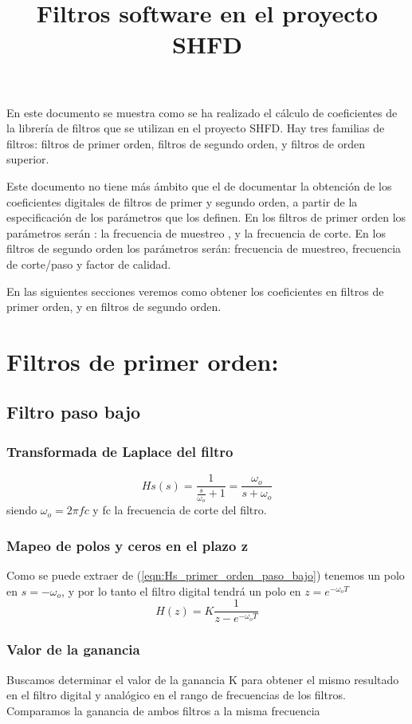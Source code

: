 \documentclass[titlepage]{article}
\title{Filtros software en el proyecto SHFD}
\date{} %
\begin{document}
 
\maketitle
En este documento se muestra como se ha realizado el cálculo de coeficientes de la librería de filtros que se utilizan en el proyecto SHFD. Hay tres familias de filtros: filtros de primer orden, filtros de segundo orden, y filtros de orden superior. 

Este documento no tiene más ámbito que el de documentar la obtención de los coeficientes digitales de filtros de primer y segundo orden, a partir de la especificación de los parámetros que los definen. En los filtros de primer orden los parámetros serán :  la frecuencia de muestreo , y la frecuencia de corte. En los filtros de segundo orden los parámetros serán: frecuencia de muestreo, frecuencia de corte/paso y factor de calidad.

En las siguientes secciones veremos como obtener los coeficientes en filtros de primer orden, y en filtros de segundo orden.

\section{Filtros de primer orden:}
\subsection{Filtro paso bajo}
\subsubsection{Transformada de Laplace del filtro}
\begin{equation}
\label{eqn:Hs_primer_orden_paso_bajo}Hs(s)=\frac{1}{\displaystyle\frac{s}{{\omega_o}}+1}=\frac{\displaystyle\omega_o}{s+\omega_o}
\end{equation}
\quad siendo ${\omega_o}=2{\pi}fc$  y fc la frecuencia de corte del filtro. 
\subsubsection{Mapeo de polos y ceros en el plazo z}
Como se puede extraer de (\ref{eqn:Hs_primer_orden_paso_bajo}) tenemos un polo en $s=-{\omega_o}$, y por lo tanto el filtro digital tendrá un polo en $z=e^{-\omega_oT}$ 
\begin{equation}
	H(z)=K\frac{1}{z-e^{-\omega_oT}} 
\end{equation}
\subsubsection{Valor de la ganancia}
Buscamos determinar el valor de la ganancia K para obtener el mismo resultado en el filtro digital y analógico en el rango de frecuencias de los filtros. Comparamos la ganancia de ambos filtros a la misma frecuencia  
\end{document}
